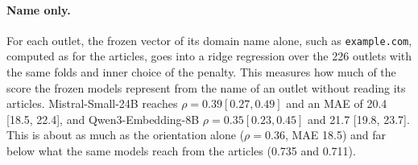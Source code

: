 \documentclass[11pt,a4paper]{article}
\begin{document}
\paragraph{Name only.} For each outlet, the frozen vector of its domain name alone, such as \texttt{example.com},
computed as for the articles, goes into a ridge regression over the 226 outlets with the same folds and inner choice of
the penalty. This measures how much of the score the frozen models represent from the name of an outlet without reading
its articles. Mistral-Small-24B reaches $\rho = 0.39 [0.27, 0.49]$ and an MAE of 20.4 [18.5, 22.4], and
Qwen3-Embedding-8B $\rho = 0.35 [0.23, 0.45]$ and 21.7 [19.8, 23.7]. This is about as much as the orientation alone
($\rho = 0.36$, MAE 18.5) and far below what the same models reach from the articles (0.735 and 0.711).

\begin{table}[h]
\centering\small
\caption{MAE per outlet under three checks (in parentheses: difference from TF-IDF).}\label{tab:robust}
\end{table}
\end{document}
